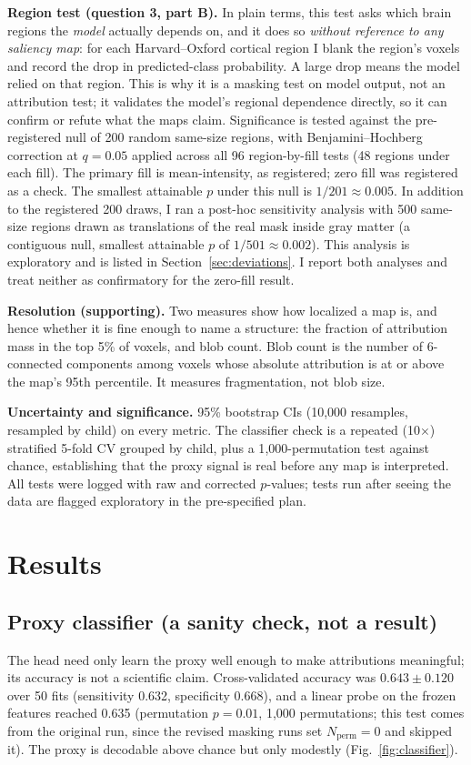\documentclass[11pt]{article}
\begin{document}
\textbf{Region test (question 3, part B).} In plain terms, this test asks which brain regions
the \emph{model} actually depends on, and it does so \emph{without reference to any saliency
map}: for each Harvard--Oxford cortical region \citep{desikan2006,makris2006} I blank the
region's voxels and record the drop in predicted-class probability. A large drop means the
model relied on that region. This is why it is a masking test on model output, not an
attribution test; it validates the model's regional dependence directly, so it can confirm
or refute what the maps claim. Significance is tested against the pre-registered null of 200 random same-size regions,
with Benjamini--Hochberg correction at $q=0.05$ \citep{benjamini1995} applied across all 96 region-by-fill tests
(48 regions under each fill). The primary fill is mean-intensity, as registered; zero fill was registered as a check. The
smallest attainable $p$ under this null is $1/201\approx0.005$. In addition to the registered 200 draws, I ran a
post-hoc sensitivity analysis with 500 same-size regions drawn as translations of the real mask inside gray matter (a contiguous
null, smallest attainable $p$ of $1/501\approx0.002$). This analysis is exploratory and is listed in Section~\ref{sec:deviations}. I report both
analyses and treat neither as confirmatory for the zero-fill result.

\textbf{Resolution (supporting).} Two measures show how localized a map is, and hence whether it is fine enough to name a structure: the fraction of attribution mass in the top 5\% of voxels, and blob count. Blob count is the number of 6-connected components among voxels whose absolute attribution is at or above the map's 95th percentile. It measures fragmentation, not blob size.

\textbf{Uncertainty and significance.} 95\% bootstrap CIs (10{,}000 resamples, resampled by
child) on every metric. The classifier check is a repeated (10$\times$) stratified 5-fold CV
grouped by child, plus a 1{,}000-permutation test against chance, establishing that the proxy
signal is real before any map is interpreted. All tests were logged with raw and corrected
$p$-values; tests run after seeing the data are flagged exploratory in the pre-specified plan.

\section{Results}

\subsection{Proxy classifier (a sanity check, not a result)}
\label{sec:proxyclf}
The head need only learn the proxy well enough to make attributions meaningful; its accuracy
is not a scientific claim. Cross-validated accuracy was $0.643\pm0.120$ over 50 fits
(sensitivity 0.632, specificity 0.668), and a linear probe on the frozen features reached
0.635 (permutation $p=0.01$, 1{,}000 permutations; this test comes from the original run, since the revised masking runs set $N_{\mathrm{perm}}=0$ and skipped it). The proxy is decodable above chance but only modestly
(Fig.~\ref{fig:classifier}).
\end{document}
